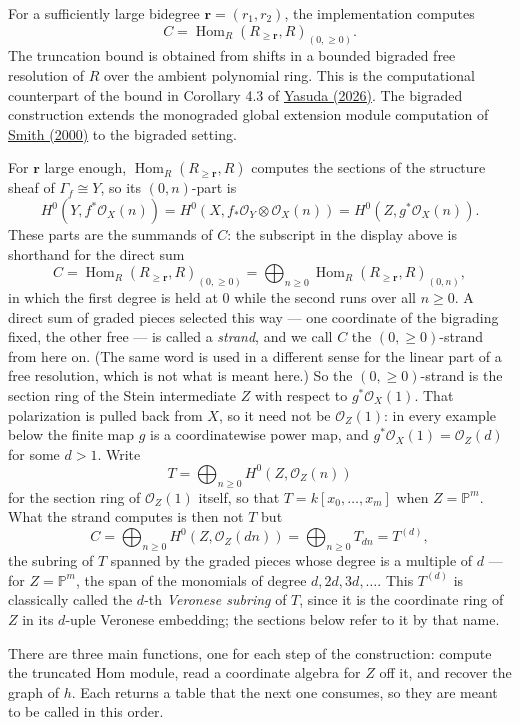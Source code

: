 \documentclass[11pt,reqno]{amsart}
\newcommand{\PP}{\ensuremath{\mathbb{P}}}
\newcommand{\sO}{\ensuremath{\mathcal{O}}}
\DeclareMathOperator{\Hom}{Hom}
\theoremstyle{plain}
\theoremstyle{definition}
\begin{document}
For a sufficiently large bidegree \(\mathbf{r}=(r_1,r_2)\), the implementation
computes
\[C=\Hom_R(R_{\geq\mathbf{r}},R)_{(0,\geq0)}.\]
The truncation bound is obtained from shifts in a bounded bigraded free
resolution of \(R\) over the ambient polynomial ring. This is the
computational counterpart of the bound in Corollary 4.3 of
\hyperref[sec:references]{Yasuda (2026)}. The bigraded construction extends
the monograded global extension module computation of
\hyperref[sec:references]{Smith (2000)} to the bigraded setting.

For \(\mathbf{r}\) large enough, \(\Hom_R(R_{\geq\mathbf{r}},R)\) computes the
sections of the structure sheaf of \(\Gamma_f\cong Y\), so its
\((0,n)\)-part is
\[H^0(Y,f^*\sO_X(n))=H^0(X,f_*\sO_Y\otimes\sO_X(n))=H^0(Z,g^*\sO_X(n)).\]
These parts are the summands of \(C\): the subscript in the display above
is shorthand for the direct sum
\[C=\Hom_R(R_{\geq\mathbf{r}},R)_{(0,\geq0)}
  =\bigoplus_{n\geq0}\Hom_R(R_{\geq\mathbf{r}},R)_{(0,n)},\]
in which the first degree is held at \(0\) while the second runs over all
\(n\geq0\). A direct sum of graded pieces selected this way --- one
coordinate of the bigrading fixed, the other free --- is called a
\emph{strand}, and we call \(C\) the \((0,\geq0)\)-strand from here on.
(The same word is used in a different sense for the linear part of a free
resolution, which is not what is meant here.) So the
\((0,\geq0)\)-strand is the section ring of the Stein intermediate \(Z\)
with respect to \(g^*\sO_X(1)\). That polarization is pulled back from
\(X\), so it need not be \(\sO_Z(1)\): in every example below the finite
map \(g\) is a coordinatewise power map, and \(g^*\sO_X(1)=\sO_Z(d)\) for
some \(d>1\). Write
\[T=\bigoplus_{n\geq0}H^0(Z,\sO_Z(n))\]
for the section ring of \(\sO_Z(1)\) itself, so that
\(T=k[x_0,\dots,x_m]\) when \(Z=\PP^m\). What the strand computes is then
not \(T\) but
\[C=\bigoplus_{n\geq0}H^0(Z,\sO_Z(dn))=\bigoplus_{n\geq0}T_{dn}=T^{(d)},\]
the subring of \(T\) spanned by the graded pieces whose degree is a
multiple of \(d\) --- for \(Z=\PP^m\), the span of the monomials of degree
\(d,2d,3d,\dots\). This \(T^{(d)}\) is classically called the \(d\)-th
\emph{Veronese subring} of \(T\), since it is the coordinate ring of
\(Z\) in its \(d\)-uple Veronese embedding; the sections below refer to it
by that name.

There are three main functions, one for each step of the construction:
compute the truncated Hom module, read a coordinate algebra for \(Z\) off
it, and recover the graph of \(h\). Each returns a table that the next one
consumes, so they are meant to be called in this order.
\end{document}
